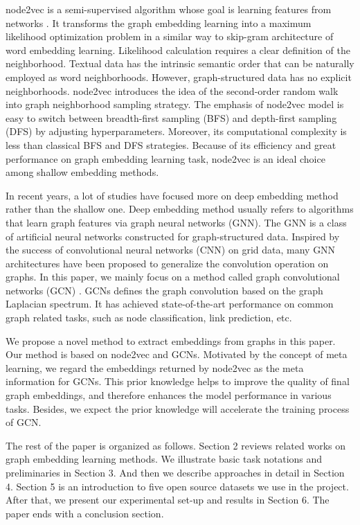 \documentclass[sigconf]{acmart}
\begin{document}
node2vec is a semi-supervised algorithm whose goal is learning features from networks \cite{node2vec}. It transforms the graph embedding learning into a maximum likelihood optimization problem in a similar way to skip-gram architecture of word embedding learning. Likelihood calculation requires a clear definition of the neighborhood. Textual data has the intrinsic semantic order that can be naturally employed as word neighborhoods. However, graph-structured data has no explicit neighborhoods. node2vec introduces the idea of the second-order random walk into graph neighborhood sampling strategy. The emphasis of node2vec model is easy to switch between breadth-first sampling (BFS) and depth-first sampling (DFS) by adjusting hyperparameters. Moreover, its computational complexity is less than classical BFS and DFS strategies. Because of its efficiency and great performance on graph embedding learning task, node2vec is an ideal choice among shallow embedding methods.\par

In recent years, a lot of studies have focused more on deep embedding method rather than the shallow one. Deep embedding method usually refers to algorithms that learn graph features via graph neural networks (GNN). The GNN is a class of artificial neural networks constructed for graph-structured data. Inspired by the success of convolutional neural networks (CNN) on grid data, many GNN architectures have been proposed to generalize the convolution operation on graphs. In this paper, we mainly focus on a method called graph convolutional networks (GCN) \cite{gcn}. GCNs defines the graph convolution based on the graph Laplacian spectrum. It has achieved state-of-the-art performance on common graph related tasks, such as node classification, link prediction, etc.\par

We propose a novel method to extract embeddings from graphs in this paper. Our method is based on node2vec and GCNs. Motivated by the concept of meta learning, we regard the embeddings returned by node2vec as the meta information for GCNs. This prior knowledge helps to improve the quality of final graph embeddings, and therefore enhances the model performance in various tasks. Besides, we expect the prior knowledge will accelerate the training process of GCN.\par

The rest of the paper is organized as follows. Section 2 reviews related works on graph embedding learning methods. We illustrate basic task notations and preliminaries in Section 3. And then we describe approaches in detail in Section 4. Section 5 is an introduction to five open source datasets we use in the project. After that, we present our experimental set-up and results in Section 6. The paper ends with a conclusion section.  
\end{document}
